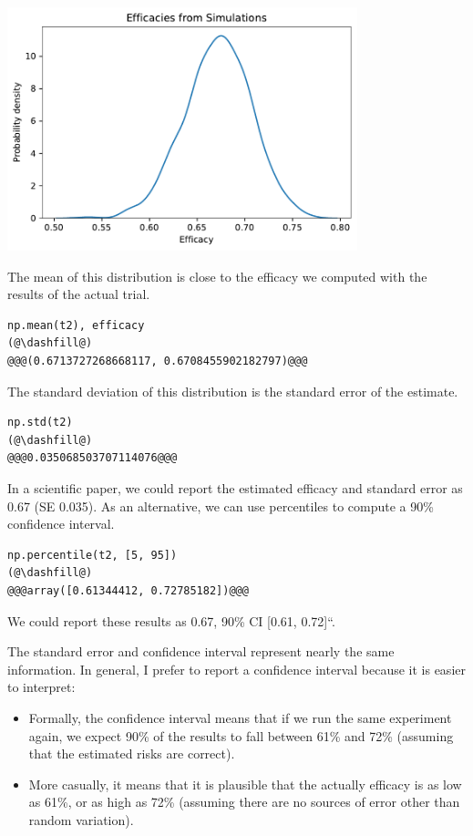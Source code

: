 \begin{center}
\includegraphics[width=4in]{chapters/11_resampling_files/11_resampling_44_0.pdf}
\end{center}

The mean of this distribution is close to the efficacy we computed with
the results of the actual trial.

\begin{lstlisting}[]
np.mean(t2), efficacy
(@\dashfill@)
@@@(0.6713727268668117, 0.6708455902182797)@@@
\end{lstlisting}

The standard deviation of this distribution is the standard error of the
estimate.

\begin{lstlisting}[]
np.std(t2)
(@\dashfill@)
@@@0.035068503707114076@@@
\end{lstlisting}

In a scientific paper, we could report the estimated efficacy and
standard error as 0.67 (SE 0.035). As an alternative, we can use
percentiles to compute a 90\% confidence interval.

\begin{lstlisting}[]
np.percentile(t2, [5, 95])
(@\dashfill@)
@@@array([0.61344412, 0.72785182])@@@
\end{lstlisting}

We could report these results as 0.67, 90\% CI {[}0.61, 0.72{]}``.

The standard error and confidence interval represent nearly the same
information. In general, I prefer to report a confidence interval
because it is easier to interpret:

\begin{itemize}
\item
  Formally, the confidence interval means that if we run the same
  experiment again, we expect 90\% of the results to fall between 61\%
  and 72\% (assuming that the estimated risks are correct).
\item
  More casually, it means that it is plausible that the actually
  efficacy is as low as 61\%, or as high as 72\% (assuming there are no
  sources of error other than random variation).
\end{itemize}

